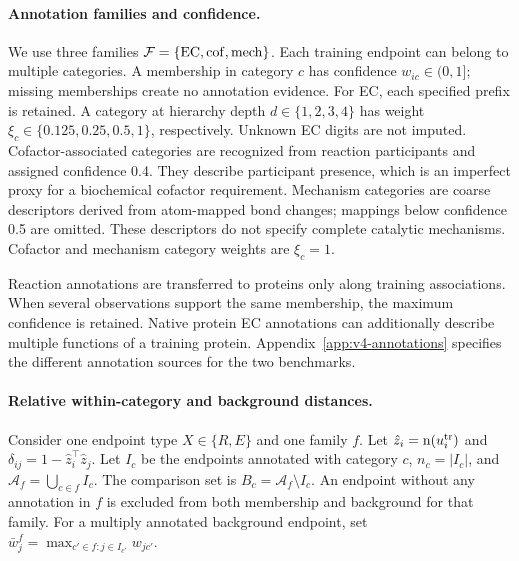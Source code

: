 \paragraph{Annotation families and confidence.}
We use three families $\mathcal F=\{\mathrm{EC},\mathrm{cof},\mathrm{mech}\}$. Each training endpoint can
belong to multiple categories. A membership in category $c$ has confidence
$w_{ic}\in(0,1]$; missing memberships create no annotation evidence.
For EC, each specified prefix is retained. A category at hierarchy depth
$d\in\{1,2,3,4\}$ has weight
$\xi_c\in\{0.125,0.25,0.5,1\}$, respectively. Unknown EC digits are not
imputed. Cofactor-associated categories are recognized from reaction
participants and assigned confidence 0.4. They describe participant presence,
which is an imperfect proxy for a biochemical cofactor requirement.
Mechanism categories are coarse descriptors derived from atom-mapped bond
changes; mappings below confidence 0.5 are omitted. These descriptors do not
specify complete catalytic mechanisms. Cofactor and mechanism category
weights are $\xi_c=1$.

Reaction annotations are transferred to proteins only along training
associations. When several observations support the same membership, the
maximum confidence is retained. Native protein EC annotations can additionally
describe multiple functions of a training protein. Appendix~\ref{app:v4-annotations}
specifies the different annotation sources for the two benchmarks.

\paragraph{Relative within-category and background distances.}
Consider one endpoint type $X\in\{R,E\}$ and one family $f$. Let
$\hat z_i=\operatorname{n}(u_i^{\mathrm{tr}})$ and
$\delta_{ij}=1-\hat z_i^\top\hat z_j$.
Let $I_c$ be the endpoints annotated with category $c$, $n_c=|I_c|$, and
$\mathcal A_f=\bigcup_{c\in f}I_c$. The comparison set is
$B_c=\mathcal A_f\setminus I_c$. An endpoint without any annotation in $f$
is excluded from both membership and background for that family. For a
multiply annotated background endpoint, set
$\bar w_j^f=\max_{c'\in f:j\in I_{c'}}w_{jc'}$.

